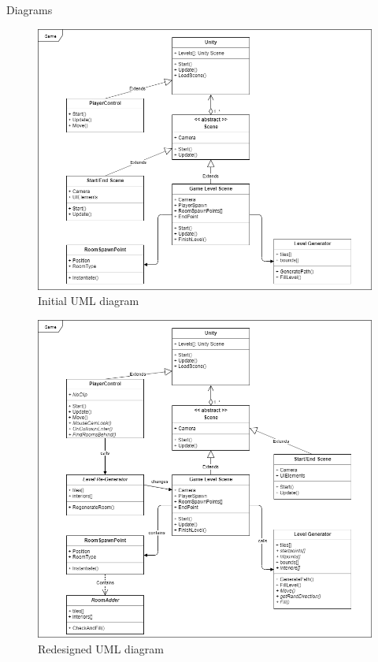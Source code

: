 \documentclass[progress]{cmpreport}
\begin{document}
\begin{section}{Diagrams}
\begin{figure}[H]
    \centering
    \includegraphics[width=\textwidth]{img/uml1.png}
    \caption{Initial UML diagram}
    \label{fig:uml1}
\end{figure}

\begin{figure}[H]
    \centering
    \includegraphics[width=\textwidth]{img/uml2.png}
    \caption{Redesigned UML diagram}
    \label{fig:uml2}
\end{figure}



\end{section}
\end{document}
